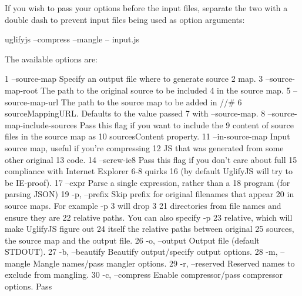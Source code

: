 If you wish to pass your options before the input files, separate the two with a double dash to prevent input files being used as option arguments\+: \begin{DoxyVerb}uglifyjs --compress --mangle -- input.js
\end{DoxyVerb}


The available options are\+:


\begin{DoxyCode}
1 --source-map                  Specify an output file where to generate source
2                               map.
3 --source-map-root             The path to the original source to be included
4                               in the source map.
5 --source-map-url              The path to the source map to be added in //#
6                               sourceMappingURL.  Defaults to the value passed
7                               with --source-map.
8 --source-map-include-sources  Pass this flag if you want to include the
9                               content of source files in the source map as
10                               sourcesContent property.
11 --in-source-map               Input source map, useful if you're compressing
12                               JS that was generated from some other original
13                               code.
14 --screw-ie8                   Pass this flag if you don't care about full
15                               compliance with Internet Explorer 6-8 quirks
16                               (by default UglifyJS will try to be IE-proof).
17 --expr                        Parse a single expression, rather than a
18                               program (for parsing JSON)
19 -p, --prefix                  Skip prefix for original filenames that appear
20                               in source maps. For example -p 3 will drop 3
21                               directories from file names and ensure they are
22                               relative paths. You can also specify -p
23                               relative, which will make UglifyJS figure out
24                               itself the relative paths between original
25                               sources, the source map and the output file.
26 -o, --output                  Output file (default STDOUT).
27 -b, --beautify                Beautify output/specify output options.
28 -m, --mangle                  Mangle names/pass mangler options.
29 -r, --reserved                Reserved names to exclude from mangling.
30 -c, --compress                Enable compressor/pass compressor options. Pass

\end{DoxyCode}
